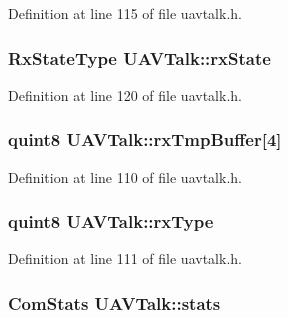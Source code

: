 Definition at line 115 of file uavtalk.\-h.

\hypertarget{group___u_a_v_talk_plugin_gacce7e3b2035887b09dce0fdbba0f1b58}{
\subsubsection[{rx\-State}]{\setlength{\rightskip}{0pt plus 5cm}Rx\-State\-Type U\-A\-V\-Talk\-::rx\-State\hspace{0.3cm}{\ttfamily [protected]}}}\label{group___u_a_v_talk_plugin_gacce7e3b2035887b09dce0fdbba0f1b58}


Definition at line 120 of file uavtalk.\-h.

\hypertarget{group___u_a_v_talk_plugin_ga94d59693bfbe92bf000ee85b559693e0}{
\subsubsection[{rx\-Tmp\-Buffer}]{\setlength{\rightskip}{0pt plus 5cm}quint8 U\-A\-V\-Talk\-::rx\-Tmp\-Buffer\mbox{[}4\mbox{]}\hspace{0.3cm}{\ttfamily [protected]}}}\label{group___u_a_v_talk_plugin_ga94d59693bfbe92bf000ee85b559693e0}


Definition at line 110 of file uavtalk.\-h.

\hypertarget{group___u_a_v_talk_plugin_ga59962a309157ed27efad61d5bf85f650}{
\subsubsection[{rx\-Type}]{\setlength{\rightskip}{0pt plus 5cm}quint8 U\-A\-V\-Talk\-::rx\-Type\hspace{0.3cm}{\ttfamily [protected]}}}\label{group___u_a_v_talk_plugin_ga59962a309157ed27efad61d5bf85f650}


Definition at line 111 of file uavtalk.\-h.

\hypertarget{group___u_a_v_talk_plugin_ga35edebb70765f832afb1174152d4e20c}{
\subsubsection[{stats}]{\setlength{\rightskip}{0pt plus 5cm}Com\-Stats U\-A\-V\-Talk\-::stats\hspace{0.3cm}{\ttfamily [protected]}}}\label{group___u_a_v_talk_plugin_ga35edebb70765f832afb1174152d4e20c}


